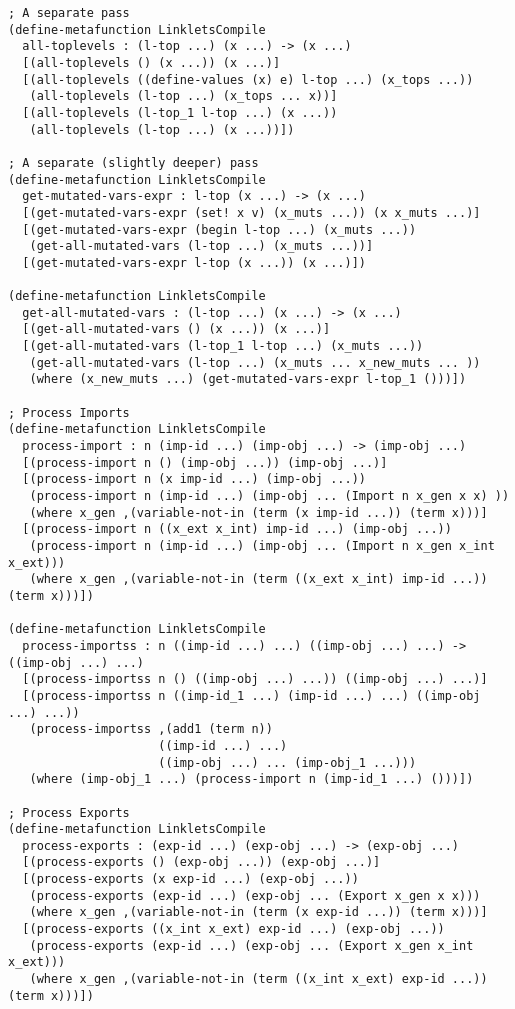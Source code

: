 \begin{lstlisting}[language=pltredex,
                basicstyle=\ttfamily\scriptsize,
                numbers=none, xleftmargin=2em]
; A separate pass
(define-metafunction LinkletsCompile
  all-toplevels : (l-top ...) (x ...) -> (x ...)
  [(all-toplevels () (x ...)) (x ...)]
  [(all-toplevels ((define-values (x) e) l-top ...) (x_tops ...))
   (all-toplevels (l-top ...) (x_tops ... x))]
  [(all-toplevels (l-top_1 l-top ...) (x ...))
   (all-toplevels (l-top ...) (x ...))])

; A separate (slightly deeper) pass
(define-metafunction LinkletsCompile
  get-mutated-vars-expr : l-top (x ...) -> (x ...)
  [(get-mutated-vars-expr (set! x v) (x_muts ...)) (x x_muts ...)]
  [(get-mutated-vars-expr (begin l-top ...) (x_muts ...))
   (get-all-mutated-vars (l-top ...) (x_muts ...))]
  [(get-mutated-vars-expr l-top (x ...)) (x ...)])

(define-metafunction LinkletsCompile
  get-all-mutated-vars : (l-top ...) (x ...) -> (x ...)
  [(get-all-mutated-vars () (x ...)) (x ...)]
  [(get-all-mutated-vars (l-top_1 l-top ...) (x_muts ...))
   (get-all-mutated-vars (l-top ...) (x_muts ... x_new_muts ... ))
   (where (x_new_muts ...) (get-mutated-vars-expr l-top_1 ()))])

; Process Imports
(define-metafunction LinkletsCompile
  process-import : n (imp-id ...) (imp-obj ...) -> (imp-obj ...)
  [(process-import n () (imp-obj ...)) (imp-obj ...)]
  [(process-import n (x imp-id ...) (imp-obj ...))
   (process-import n (imp-id ...) (imp-obj ... (Import n x_gen x x) ))
   (where x_gen ,(variable-not-in (term (x imp-id ...)) (term x)))]
  [(process-import n ((x_ext x_int) imp-id ...) (imp-obj ...))
   (process-import n (imp-id ...) (imp-obj ... (Import n x_gen x_int x_ext)))
   (where x_gen ,(variable-not-in (term ((x_ext x_int) imp-id ...)) (term x)))])

(define-metafunction LinkletsCompile
  process-importss : n ((imp-id ...) ...) ((imp-obj ...) ...) -> ((imp-obj ...) ...)
  [(process-importss n () ((imp-obj ...) ...)) ((imp-obj ...) ...)]
  [(process-importss n ((imp-id_1 ...) (imp-id ...) ...) ((imp-obj ...) ...))
   (process-importss ,(add1 (term n))
                     ((imp-id ...) ...)
                     ((imp-obj ...) ... (imp-obj_1 ...)))
   (where (imp-obj_1 ...) (process-import n (imp-id_1 ...) ()))])

; Process Exports
(define-metafunction LinkletsCompile
  process-exports : (exp-id ...) (exp-obj ...) -> (exp-obj ...)
  [(process-exports () (exp-obj ...)) (exp-obj ...)]
  [(process-exports (x exp-id ...) (exp-obj ...))
   (process-exports (exp-id ...) (exp-obj ... (Export x_gen x x)))
   (where x_gen ,(variable-not-in (term (x exp-id ...)) (term x)))]
  [(process-exports ((x_int x_ext) exp-id ...) (exp-obj ...))
   (process-exports (exp-id ...) (exp-obj ... (Export x_gen x_int x_ext)))
   (where x_gen ,(variable-not-in (term ((x_int x_ext) exp-id ...)) (term x)))])







\end{lstlisting}
